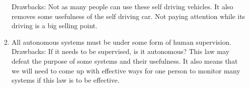 \documentclass[12pt]{exam}
\begin{document}
\begin{questions}
\begin{parts}
\begin{enumerate}
        Drawbacks: Not as many people can use these self driving vehicles. It also removes some usefulness of the self driving car. Not paying attention while its driving is a big selling point. \\
        
        \item All autonomous systems must be under some form of human supervision. \\
        
        Drawbacks: If it needs to be supervised, is it autonomous? This law may defeat the purpose of some systems and their usefulness. It also means that we will need to come up with effective ways for one person to monitor many systems if this law is to be effective.
    \end{enumerate}
\end{parts}












\end{questions}
\end{document}
